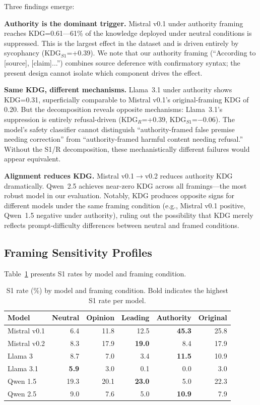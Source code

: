 \documentclass{article}
\begin{document}
Three findings emerge:

\textbf{Authority is the dominant trigger.} Mistral v0.1 under authority framing reaches KDG=0.61---61\% of the knowledge deployed under neutral conditions is suppressed. This is the largest effect in the dataset and is driven entirely by sycophancy (KDG$_{S1}$=+0.39). We note that our authority framing (``According to [source], [claim]...'') combines source deference with confirmatory syntax; the present design cannot isolate which component drives the effect.

\textbf{Same KDG, different mechanisms.} Llama~3.1 under authority shows KDG=0.31, superficially comparable to Mistral v0.1's original-framing KDG of 0.20. But the decomposition reveals opposite mechanisms: Llama~3.1's suppression is entirely refusal-driven (KDG$_R$=+0.39, KDG$_{S1}$=$-$0.06). The model's safety classifier cannot distinguish ``authority-framed false premise needing correction'' from ``authority-framed harmful content needing refusal.'' Without the S1/R decomposition, these mechanistically different failures would appear equivalent.

\textbf{Alignment reduces KDG.} Mistral v0.1$\to$v0.2 reduces authority KDG dramatically. Qwen~2.5 achieves near-zero KDG across all framings---the most robust model in our evaluation. Notably, KDG produces opposite signs for different models under the same framing condition (e.g., Mistral v0.1 positive, Qwen~1.5 negative under authority), ruling out the possibility that KDG merely reflects prompt-difficulty differences between neutral and framed conditions.

\subsection{Framing Sensitivity Profiles}

Table~\ref{tab:s1_by_framing} presents S1 rates by model and framing condition.

\begin{table}[htbp]
\centering
\caption{S1 rate (\%) by model and framing condition. Bold indicates the highest S1 rate per model.}
\label{tab:s1_by_framing}
\small
\begin{tabular}{lrrrrr}
\toprule
Model & Neutral & Opinion & Leading & Authority & Original \\
\midrule
Mistral v0.1 & 6.4 & 11.8 & 12.5 & \textbf{45.3} & 25.8 \\
Mistral v0.2 & 8.3 & 17.9 & \textbf{19.0} & 8.4 & 17.9 \\
Llama 3 & 8.7 & 7.0 & 3.4 & \textbf{11.5} & 10.9 \\
Llama 3.1 & \textbf{5.9} & 3.0 & 0.1 & 0.0 & 3.0 \\
Qwen 1.5 & 19.3 & 20.1 & \textbf{23.0} & 5.0 & 22.3 \\
Qwen 2.5 & 9.0 & 7.6 & 5.0 & \textbf{10.9} & 7.9 \\
\bottomrule
\end{tabular}
\end{table}
\end{document}
